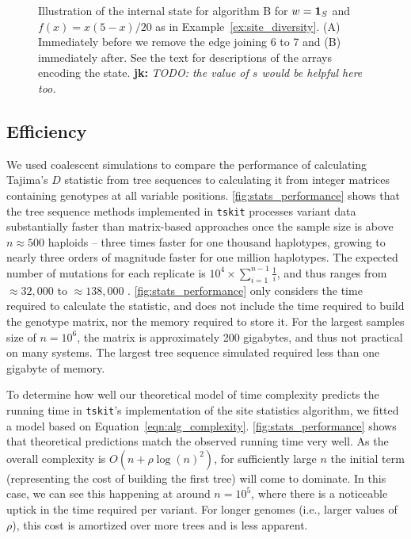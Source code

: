 \documentclass{article}
\newcommand{\tskit}{{\texttt{tskit}}}
\newcommand{\iw}{w} %
\newcommand{\jk}[1]{{\color{red}\textbf{jk:} \it #1}}
\begin{document}
\begin{figure}
    \caption{
    Illustration of the internal state for algorithm B for $\iw = \bone_S$ and
    $f(x) = x(5 - x) / 20$ as in Example~\ref{ex:site_diversity}. (A)
    Immediately before we remove the edge joining 6 to 7 and (B) immediately after.
    See the text for descriptions of the arrays encoding the state.
    \jk{TODO: the value of $s$ would be helpful here too.}
    \label{fig:algorithm_example}}
\end{figure}

\subsection*{Efficiency}

We used coalescent simulations to compare the performance of calculating Tajima's \citeyearpar{Tajima1989-de} $D$
statistic from tree sequences to calculating it from integer matrices containing genotypes at all variable positions.
\autoref{fig:stats_performance} shows that the tree sequence methods implemented in \texttt{tskit} processes variant data
substantially faster than matrix-based approaches once the sample size is above $n \approx 500$ haploids --
three times faster for one thousand haplotypes,
growing to nearly three orders of magnitude faster for one million haplotypes.
The expected number of mutations for each replicate is $10^4 \times \sum_{i=1}^{n-1}\frac{1}{i}$, and thus ranges from
$\approx 32,000$ to $\approx 138,000$ \citep{Watterson1975-ej}.
\autoref{fig:stats_performance} only considers the time required to calculate the statistic,
and does not include the time required to build the genotype matrix, nor the memory required to store it.
For the largest samples size of $n=10^6$,
the matrix is approximately 200 gigabytes, and thus not practical on many systems.
The largest tree sequence simulated required less than one gigabyte of memory.

To determine how well our theoretical model of time complexity predicts the
running time in \tskit{}'s implementation of the site statistics algorithm,
we fitted a model based on Equation~\eqref{eqn:alg_complexity}.
\autoref{fig:stats_performance} shows that theoretical predictions match
the observed running time very well. As the overall complexity is
$O(n + \rho \log(n)^2)$, for sufficiently large $n$ the initial term
(representing the cost of building the first tree) will come to dominate.
In this case, we can see this happening at around $n = 10^5$, where there
is a noticeable uptick in the time required per variant. For
longer genomes (i.e., larger values of $\rho$), this cost is amortized over more trees
and is less apparent.
\end{document}
